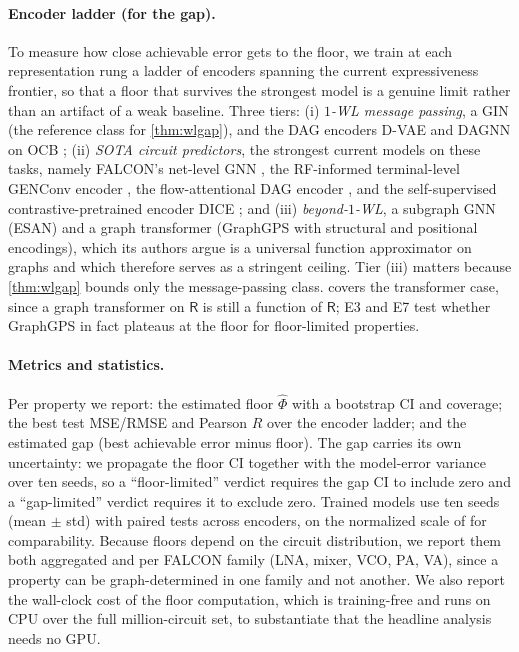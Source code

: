 \documentclass[10pt]{article}
\newcommand{\R}{\mathsf{R}}
\begin{document}
\paragraph{Encoder ladder (for the gap).}
To measure how close achievable error gets to the floor, we train at each representation rung a ladder of encoders spanning the current expressiveness frontier, so that a floor that survives the strongest model is a genuine limit rather than an artifact of a weak baseline. Three tiers: (i) \emph{$1$-WL message passing}, a GIN \citep{xu2019gin} (the reference class for \cref{thm:wlgap}), and the DAG encoders D-VAE and DAGNN on OCB \citep{zhang2019dvae,thost2021dagnn}; (ii) \emph{SOTA circuit predictors}, the strongest current models on these tasks, namely FALCON's net-level GNN \citep{mehradfar2025falcon}, the RF-informed terminal-level GENConv encoder \citep{asadi2025rfinformed}, the flow-attentional DAG encoder \citep{plettenberg2025flow}, and the self-supervised contrastive-pretrained encoder DICE \citep{lee2025dice}; and (iii) \emph{beyond-$1$-WL}, a subgraph GNN (ESAN) \citep{bevilacqua2022esan} and a graph transformer (GraphGPS with structural and positional encodings), which its authors argue is a universal function approximator on graphs \citep{rampasek2022graphgps} and which therefore serves as a stringent ceiling. Tier (iii) matters because \cref{thm:wlgap} bounds only the message-passing class.  covers the transformer case, since a graph transformer on $\R$ is still a function of $\R$; E3 and E7 test whether GraphGPS in fact plateaus at the floor for floor-limited properties.

\paragraph{Metrics and statistics.}
Per property we report: the estimated floor $\widehat{\Phi}$ with a bootstrap CI and coverage; the best test MSE/RMSE and Pearson $R$ over the encoder ladder; and the estimated gap (best achievable error minus floor). The gap carries its own uncertainty: we propagate the floor CI together with the model-error variance over ten seeds, so a ``floor-limited'' verdict requires the gap CI to include zero and a ``gap-limited'' verdict requires it to exclude zero. Trained models use ten seeds (mean $\pm$ std) with paired tests across encoders, on the normalized scale of \citep{dong2023cktgnn,plettenberg2025flow} for comparability. Because floors depend on the circuit distribution, we report them both aggregated and per FALCON family (LNA, mixer, VCO, PA, VA), since a property can be graph-determined in one family and not another. We also report the wall-clock cost of the floor computation, which is training-free and runs on CPU over the full million-circuit set, to substantiate that the headline analysis needs no GPU.
\end{document}
